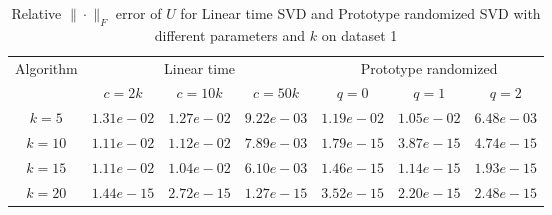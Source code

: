 \begin{table}[H]\label{U1}
\centering
\begin{tabular}{|c|c|c|c|c|c|c|}

\hline
\multirow{2}{*}{ Algorithm} &\multicolumn{3}{c|}{Linear time} &\multicolumn{3}{c|}{Prototype randomized}\\\cline{2-7}
 &$c=2k$ &$c=10k$ &$c=50k$ &$q=0$ &$q=1$ &$q=2$\\\hline
$k=5$ & $1.31e-02$ & $1.27e-02$ & $9.22e-03$ & $1.19e-02$ & $1.05e-02$ & $6.48e-03$\\\hline
$k=10$ & $1.11e-02$ & $1.12e-02$ & $7.89e-03$ & $1.79e-15$ & $3.87e-15$ & $4.74e-15$\\\hline
$k=15$ & $1.11e-02$ & $1.04e-02$ & $6.10e-03$ & $1.46e-15$ & $1.14e-15$ & $1.93e-15$\\\hline
$k=20$ & $1.44e-15$ & $2.72e-15$ & $1.27e-15$ & $3.52e-15$ & $2.20e-15$ & $2.48e-15$\\\hline
\end{tabular}
\caption{Relative $\|\cdot\|_F$ error of $U$ for Linear time SVD and Prototype randomized SVD with different parameters and $k$ on dataset 1}
\end{table}
